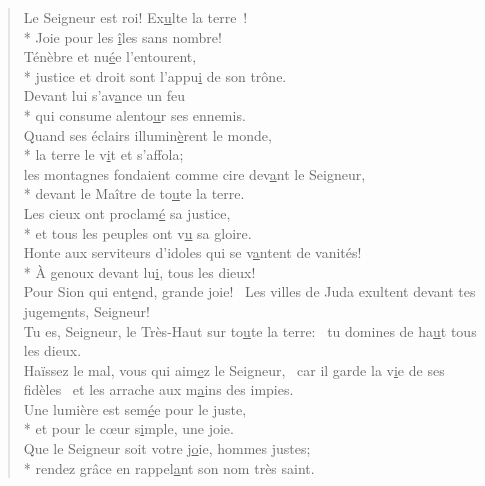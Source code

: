 \begin{verse}
Le Seigneur est roi! Ex\underline{u}lte la terre ! \\*
Joie pour les \underline{î}les sans nombre! \\

Ténèbre et nu\underline{é}e l’entourent, \\*
justice et droit sont l’appu\underline{i} de son trône. \\
Devant lui s’av\underline{a}nce un feu \\*
qui consume alento\underline{u}r ses ennemis. \\

Quand ses éclairs illumin\underline{è}rent le monde, \\*
la terre le v\underline{i}t et s’affola; \\
les montagnes fondaient comme cire dev\underline{a}nt le Seigneur, \\*
devant le Maître de to\underline{u}te la terre. \\

Les cieux ont proclam\underline{é} sa justice, \\*
et tous les peuples ont v\underline{u} sa gloire. \\
Honte aux serviteurs d’idoles qui se v\underline{a}ntent de vanités! \\*
À genoux devant lu\underline{i}, tous les dieux! \\

Pour Sion qui ent\underline{e}nd, grande joie!~\psalmstar
Les villes de Juda exultent devant tes jugem\underline{e}nts, Seigneur! \\

Tu es, Seigneur, le Très-Haut sur to\underline{u}te la terre:~\psalmstar
tu domines de ha\underline{u}t tous les dieux. \\

Haïssez le mal, vous qui aim\underline{e}z le Seigneur,~\psalmdagger
car il garde la v\underline{i}e de ses fidèles~\psalmstar
et les arrache aux m\underline{a}ins des impies. \\

Une lumière est sem\underline{é}e pour le juste, \\*
et pour le cœur s\underline{i}mple, une joie. \\
Que le Seigneur soit votre j\underline{o}ie, hommes justes; \\*
rendez grâce en rappel\underline{a}nt son nom très saint. \\
\end{verse}

